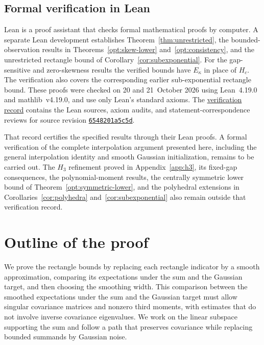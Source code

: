 \documentclass[11pt,letterpaper]{article}
\theoremstyle{remark}
\begin{document}
\subsection{\texorpdfstring{Formal verification in Lean}{Formal verification in Lean}}\label{sec:lean-certification}
Lean is a proof assistant that checks formal mathematical proofs by
computer. A separate Lean development establishes
Theorem~\ref{thm:unrestricted}, the bounded-observation results in
Theorems~\ref{opt:skew-lower} and~\ref{opt:consistency}, and the
unrestricted rectangle bound of Corollary~\ref{cor:subexponential}.
For the gap-sensitive and zero-skewness results the verified bounds
have \(E_\kappa\) in place of \(H_c\). The verification also covers
the corresponding earlier sub-exponential rectangle bound.
These proofs were checked on 20 and 21~October 2026 using Lean~4.19.0
and mathlib~v4.19.0, and use only Lean's standard axioms. The
\href{https://github.com/VC2015/HDCLTs/blob/bbf1ab99c733a398c181ca8c9f5a243a41f258c6/verification/2026-10-21-companion-results/README.md}{verification record}
contains the Lean sources, axiom audits, and statement-correspondence
reviews for source revision
\href{https://github.com/VC2015/HDCLTs/commit/6548201a5c5d9c132a53f1d504f7ef70346aa782}{\texttt{6548201a5c5d}}.

That record certifies the specified results through their Lean proofs.
A formal verification of the complete interpolation argument presented
here, including the general interpolation identity and smooth Gaussian
initialization, remains to be carried out.
The \(H_3\) refinement proved in Appendix~\ref{app:h3}, its fixed-gap
consequences, the polynomial-moment results, the centrally symmetric lower bound
of Theorem~\ref{opt:symmetric-lower}, and the polyhedral extensions in
Corollaries~\ref{cor:polyhedra} and~\ref{cor:subexponential} also
remain outside that verification record.

\section{Outline of the proof}
\label{sec:smoothing}

We prove the rectangle bounds by replacing each rectangle indicator
by a smooth approximation, comparing its expectations under the sum
and the Gaussian target, and then choosing the smoothing width.
This comparison between the smoothed expectations under the sum and
the Gaussian target must allow singular covariance matrices and nonzero
third moments, with estimates that do not involve inverse covariance
eigenvalues. We work on the linear subspace supporting the sum and
follow a path that preserves covariance while replacing bounded
summands by Gaussian noise.
\end{document}
